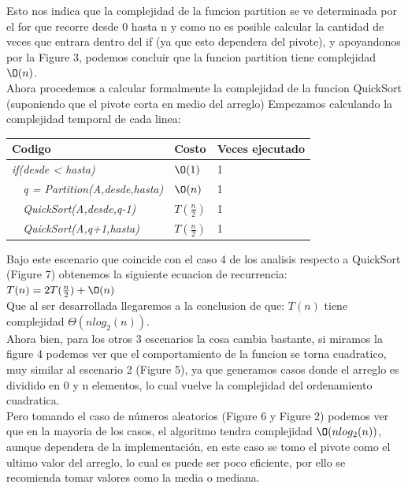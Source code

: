 \documentclass[spanish]{article}
\begin{document}
	Esto nos indica que la complejidad de la funcion partition se ve determinada por el for que recorre desde 0 hasta n y como no es posible calcular la cantidad de veces que entrara dentro del if (ya que esto dependera del pivote), y apoyandonos por la Figure 3, podemos concluir que la funcion partition tiene complejidad $\O(n)$.\\			
	Ahora procedemos a calcular formalmente la complejidad de la funcion QuickSort (suponiendo que el pivote corta en medio del arreglo)
	Empezamos calculando la complejidad temporal de cada linea:
	\begin{center}
		\begin{table}[H]
			\begin{tabular}{|l|l|l|}
				\hline
				\rowcolor[HTML]{FFCC67} 
				Codigo                           & Costo & Veces ejecutado \\ \hline
				\textit{if(desde < hasta)}                    & $\O(1)$    & 1               \\ \hline
				\textit{\  \  q = Partition(A,desde,hasta)}                    & $\O(n)$    & 1               \\ \hline
				\textit{\  \  QuickSort(A,desde,q-1)}                    & $T(\frac{n}{2})$    & 1               \\ \hline						
				\textit{\  \  QuickSort(A,q+1,hasta)}                    & $T(\frac{n}{2})$    & 1               \\ \hline						
			\end{tabular}
		\end{table}										
	\end{center}
	Bajo este escenario que coincide con el caso 4 de los analisis respecto a QuickSort (Figure 7) obtenemos la siguiente ecuacion de recurrencia:\\
	$T(n) = 2T(\frac{n}{2})+\O(n)$\\
	Que al ser desarrollada llegaremos a la conclusion de que: $T(n)$ tiene complejidad $\Theta(nlog_2(n))$.\\
	Ahora bien, para los otros 3 escenarios la cosa cambia bastante, si miramos la figure 4 podemos ver que el comportamiento de la funcion se torna cuadratico, muy similar al escenario 2 (Figure 5), ya que generamos casos donde el arreglo es dividido en 0 y n elementos, lo cual vuelve la complejidad del ordenamiento cuadratica.\\
	Pero tomando el caso de números aleatorios (Figure 6 y Figure 2) podemos ver que en la mayoria de los casos, el algoritmo tendra complejidad $\O(nlog_2(n))$, aunque dependera de la implementación, en este caso se tomo el pivote como el ultimo valor del arreglo, lo cual es puede ser poco eficiente, por ello se recomienda tomar valores como la media o mediana.\\
\end{document}
